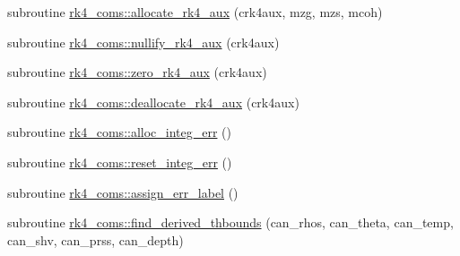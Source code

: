 \begin{DoxyCompactItemize}
\item 
subroutine \hyperlink{namespacerk4__coms_afe1de3958c4ca4c64d5fb2160fced95f}{rk4\+\_\+coms\+::allocate\+\_\+rk4\+\_\+aux} (crk4aux, mzg, mzs, mcoh)
\item 
subroutine \hyperlink{namespacerk4__coms_a306ba21ba388b2e51767aa9f5d76eda0}{rk4\+\_\+coms\+::nullify\+\_\+rk4\+\_\+aux} (crk4aux)
\item 
subroutine \hyperlink{namespacerk4__coms_a0af8d3f6d5452c98c81c5230f3b22343}{rk4\+\_\+coms\+::zero\+\_\+rk4\+\_\+aux} (crk4aux)
\item 
subroutine \hyperlink{namespacerk4__coms_a5af13b35af38a83aed0e367f7053ffc3}{rk4\+\_\+coms\+::deallocate\+\_\+rk4\+\_\+aux} (crk4aux)
\item 
subroutine \hyperlink{namespacerk4__coms_a8266a2612a37eea2fc3106633e25f954}{rk4\+\_\+coms\+::alloc\+\_\+integ\+\_\+err} ()
\item 
subroutine \hyperlink{namespacerk4__coms_aa58f2e011f087e610d94022bed90be7a}{rk4\+\_\+coms\+::reset\+\_\+integ\+\_\+err} ()
\item 
subroutine \hyperlink{namespacerk4__coms_ae49c70a18c8dfa81befa51bc5244ab8c}{rk4\+\_\+coms\+::assign\+\_\+err\+\_\+label} ()
\item 
subroutine \hyperlink{namespacerk4__coms_ae622426587059dbf68f96f24c502091a}{rk4\+\_\+coms\+::find\+\_\+derived\+\_\+thbounds} (can\+\_\+rhos, can\+\_\+theta, can\+\_\+temp,                                                                                                                                                                                                                                                   can\+\_\+shv, can\+\_\+prss, can\+\_\+depth)
\end{DoxyCompactItemize}
